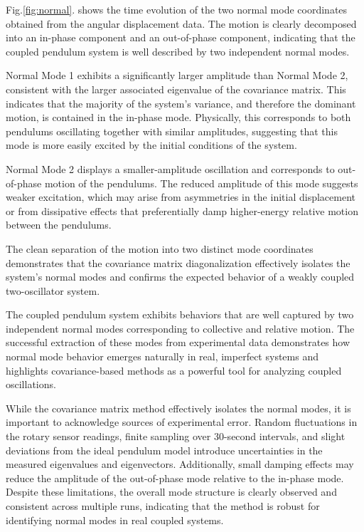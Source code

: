 \documentclass[reprint,amsmath,amssymb,aps,prb,footinbib,floatfix]{revtex4-2}
\begin{document}
Fig.\ref{fig:normal}. shows the time evolution of the two normal mode coordinates obtained from the angular displacement data. The motion is clearly decomposed into an in-phase component and an out-of-phase component, indicating that the coupled pendulum system is well described by two independent normal modes.

Normal Mode 1 exhibits a significantly larger amplitude than Normal Mode 2, consistent with the larger associated eigenvalue of the covariance matrix. This indicates that the majority of the system’s variance, and therefore the dominant motion, is contained in the in-phase mode. Physically, this corresponds to both pendulums oscillating together with similar amplitudes, suggesting that this mode is more easily excited by the initial conditions of the system.

Normal Mode 2 displays a smaller-amplitude oscillation and corresponds to out-of-phase motion of the pendulums. The reduced amplitude of this mode suggests weaker excitation, which may arise from asymmetries in the initial displacement or from dissipative effects that preferentially damp higher-energy relative motion between the pendulums.

The clean separation of the motion into two distinct mode coordinates demonstrates that the covariance matrix diagonalization effectively isolates the system’s normal modes and confirms the expected behavior of a weakly coupled two-oscillator system.

The coupled pendulum system exhibits behaviors that are well captured by two independent normal modes corresponding to collective and relative motion. The successful extraction of these modes from experimental data demonstrates how normal mode behavior emerges naturally in real, imperfect systems and highlights covariance-based methods as a powerful tool for analyzing coupled oscillations.

While the covariance matrix method effectively isolates the normal modes, it is important to acknowledge sources of experimental error. Random fluctuations in the rotary sensor readings, finite sampling over 30-second intervals, and slight deviations from the ideal pendulum model introduce uncertainties in the measured eigenvalues and eigenvectors. Additionally, small damping effects may reduce the amplitude of the out-of-phase mode relative to the in-phase mode. Despite these limitations, the overall mode structure is clearly observed and consistent across multiple runs, indicating that the method is robust for identifying normal modes in real coupled systems.
\end{document}

